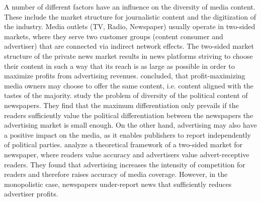 \documentclass[12pt,a4paper,notitlepage]{article}
\begin{document}
A number of different factors have an influence on the diversity of media content. These include the market structure for journalistic content and the digitization of the industry. Media outlets (TV, Radio, Newspaper) usually operate in two-sided markets, where they serve two customer groups (content consumer and advertiser) that are connected via indirect network effects. The two-sided market structure of the private news market results in news platforms striving to choose their content in such a way that its reach is as large as possible in order to maximize profits from advertising revenues. \citet{steiner_program_1952} concluded, that profit-maximizing media owners may choose to offer the same content, i.e. content aligned with the tastes of the majority. \citet{gabszewicz_press_2001} study the problem of diversity of the political content of newspapers. They find that the maximum differentiation only prevails if the readers sufficiently value the political differentiation between the newspapers the advertising market is small enough. On the other hand, advertising may also have a positive impact on the media, as it enables publishers to report independently of political parties. \citet{ellman_what_2009} analyze a theoretical framework of a two-sided market for newspaper, where readers value accuracy and advertisers value advert-receptive readers. They found that advertising increases the intensity of competition for readers and therefore raises accuracy of media coverage. However, in the monopolistic case, newspapers under-report news that sufficiently reduces advertiser profits. 
\end{document}
